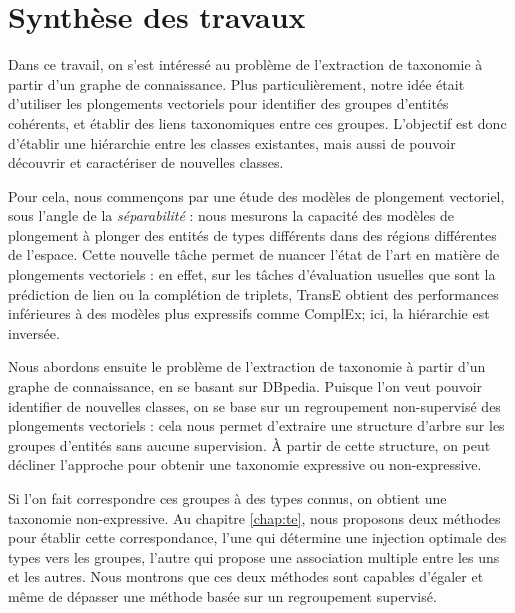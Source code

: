 \label{sec:Conclusion}




\section{Synthèse des travaux}


Dans ce travail, on s'est intéressé au problème de l'extraction de taxonomie à partir d'un graphe de connaissance. Plus particulièrement, notre idée était d'utiliser les plongements vectoriels pour identifier des groupes d'entités cohérents, et établir des liens taxonomiques entre ces groupes. L'objectif est donc d'établir une hiérarchie entre les classes existantes, mais aussi de pouvoir découvrir et caractériser de nouvelles classes. 

Pour cela, nous commençons par une étude des modèles de plongement vectoriel, sous l'angle de la \textit{séparabilité} : nous mesurons la capacité des modèles de plongement à plonger des entités de types différents dans des régions différentes de l'espace. %
%
Cette nouvelle tâche permet de nuancer l'état de l'art en matière de plongements vectoriels : en effet, sur les tâches d'évaluation usuelles que sont la prédiction de lien ou la complétion de triplets, TransE obtient des performances inférieures à des modèles plus expressifs comme ComplEx; ici, la hiérarchie est inversée.


Nous abordons ensuite le problème de l'extraction de taxonomie à partir d'un graphe de connaissance, en se basant sur DBpedia. Puisque l'on veut pouvoir identifier de nouvelles classes, on se base sur un regroupement non-supervisé des plongements vectoriels : cela nous permet d'extraire une structure d'arbre sur les groupes d'entités sans aucune supervision. À partir de cette structure, on peut décliner l'approche pour obtenir une taxonomie expressive ou non-expressive.

Si l'on fait correspondre ces groupes à des types connus, on obtient une taxonomie non-expressive. Au chapitre \ref{chap:te}, nous proposons deux méthodes pour établir cette correspondance, l'une qui détermine une injection optimale des types vers les groupes, l'autre qui propose une association multiple entre les uns et les autres. Nous montrons que ces deux méthodes sont capables d'égaler et même de dépasser une méthode basée sur un regroupement supervisé.

